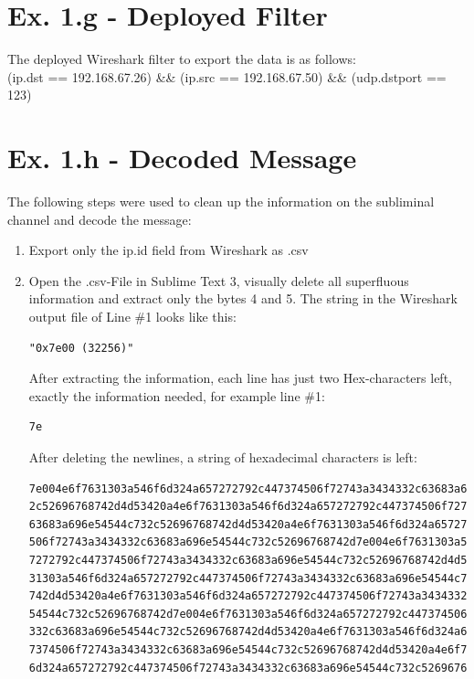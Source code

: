 \documentclass{article}
\begin{document}
\section*{Ex. 1.g - Deployed Filter}
The deployed Wireshark filter to export the data is as follows:\\
(ip.dst == 192.168.67.26) \&\& (ip.src == 192.168.67.50) \&\& (udp.dstport == 123)

\section*{Ex. 1.h - Decoded Message}
The following steps were used to clean up the information on the subliminal channel and decode the message:

\begin{enumerate}
\item Export only the ip.id field from Wireshark as .csv
\item Open the .csv-File in Sublime Text 3, visually delete all superfluous information and extract only the bytes 4 and 5. 
The string in the Wireshark output file of Line \#1 looks like this:
\begin{verbatim}
"0x7e00 (32256)"
\end{verbatim}

After extracting the information, each line has just two Hex-characters left, exactly the information needed, for example  line \#1:
\begin{verbatim}
7e
\end{verbatim}

\newpage

After deleting the newlines, a string of hexadecimal characters is left:

\begin{verbatim}
7e004e6f7631303a546f6d324a657272792c447374506f72743a3434332c63683a696e54544c73
2c52696768742d4d53420a4e6f7631303a546f6d324a657272792c447374506f72743a3434332c
63683a696e54544c732c52696768742d4d53420a4e6f7631303a546f6d324a657272792c447374
506f72743a3434332c63683a696e54544c732c52696768742d7e004e6f7631303a546f6d324a65
7272792c447374506f72743a3434332c63683a696e54544c732c52696768742d4d53420a4e6f76
31303a546f6d324a657272792c447374506f72743a3434332c63683a696e54544c732c52696768
742d4d53420a4e6f7631303a546f6d324a657272792c447374506f72743a3434332c63683a696e
54544c732c52696768742d7e004e6f7631303a546f6d324a657272792c447374506f72743a3434
332c63683a696e54544c732c52696768742d4d53420a4e6f7631303a546f6d324a657272792c44
7374506f72743a3434332c63683a696e54544c732c52696768742d4d53420a4e6f7631303a546f
6d324a657272792c447374506f72743a3434332c63683a696e54544c732c5269676874
\end{verbatim}


\end{enumerate}
\end{document}
